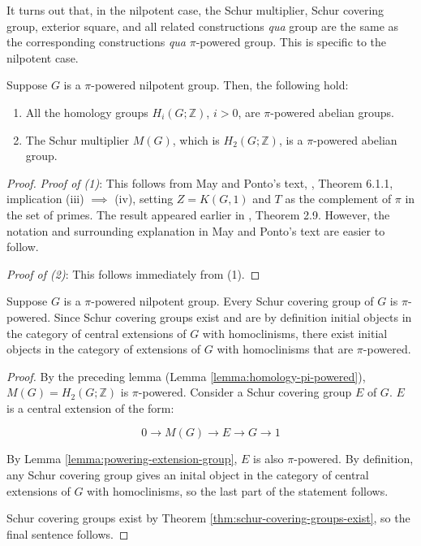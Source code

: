 \documentclass{ucetd}
\begin{document}
It turns out that, in the nilpotent case, the Schur multiplier, Schur
covering group, exterior square, and all related constructions {\em
  qua} group are the same as the corresponding constructions {\em qua}
$\pi$-powered group. This is specific to the nilpotent case.

\begin{lemma}\label{lemma:homology-pi-powered}
  Suppose $G$ is a $\pi$-powered nilpotent group. Then, the following
  hold:

  \begin{enumerate}
    \item All the homology groups $H_i(G;\mathbb{Z})$, $i > 0$, are
      $\pi$-powered abelian groups.
    \item The Schur multiplier $M(G)$, which is $H_2(G;\mathbb{Z})$, is
      a $\pi$-powered abelian group.
  \end{enumerate}
\end{lemma}

\begin{proof}
  {\em Proof of (1)}: This follows from May and Ponto's text,
  \cite{ConciseII}, Theorem 6.1.1, implication (iii) $\implies$ (iv),
  setting $Z = K(G,1)$ and $T$ as the complement of $\pi$ in the set
  of primes. The result appeared earlier in
  \cite{HiltonMislinRoitberg}, Theorem 2.9. However, the notation and
  surrounding explanation in May and Ponto's text are easier to
  follow. 

  {\em Proof of (2)}: This follows immediately from (1).
\end{proof}

\begin{lemma}\label{lemma:schur-cover-pi-powered}
  Suppose $G$ is a $\pi$-powered nilpotent group. Every Schur covering
  group of $G$ is $\pi$-powered. Since Schur covering groups exist and
  are by definition initial objects in the category of central
  extensions of $G$ with homoclinisms, there exist initial objects in
  the category of extensions of $G$ with homoclinisms that are
  $\pi$-powered.
\end{lemma}

\begin{proof}
  By the preceding lemma (Lemma \ref{lemma:homology-pi-powered}),
  $M(G) = H_2(G;\mathbb{Z})$ is $\pi$-powered. Consider a Schur
  covering group $E$ of $G$. $E$ is a central extension of the form:

  $$0 \to M(G) \to E \to G \to 1$$

  By Lemma \ref{lemma:powering-extension-group}, $E$ is also
  $\pi$-powered. By definition, any Schur covering group gives an
  inital object in the category of central extensions of $G$ with
  homoclinisms, so the last part of the statement follows.

  Schur covering groups exist by Theorem
  \ref{thm:schur-covering-groups-exist}, so the final sentence
  follows.
\end{proof}
\end{document}
